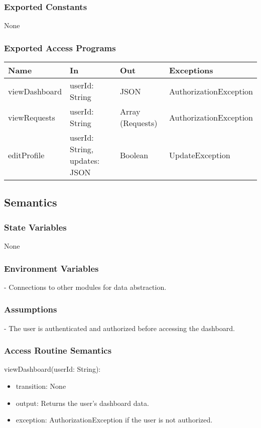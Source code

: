 \documentclass[12pt, titlepage]{article}
\begin{document}
\subsubsection{Exported Constants}
None

\subsubsection{Exported Access Programs}
\begin{center}
\begin{tabular}{p{4cm} p{4cm} p{4cm} p{2cm}}
\hline
\textbf{Name} & \textbf{In} & \textbf{Out} & \textbf{Exceptions} \\
\hline
viewDashboard & userId: String & JSON & AuthorizationException \\
viewRequests & userId: String & Array (Requests) & AuthorizationException \\
editProfile & userId: String, updates: JSON & Boolean & UpdateException \\
\hline
\end{tabular}
\end{center}

\subsection{Semantics}

\subsubsection{State Variables}
None

\subsubsection{Environment Variables}
- Connections to other modules for data abstraction.

\subsubsection{Assumptions}
- The user is authenticated and authorized before accessing the dashboard.

\subsubsection{Access Routine Semantics}
\noindent viewDashboard(userId: String):
\begin{itemize}
\item transition: None
\item output: Returns the user's dashboard data.
\item exception: AuthorizationException if the user is not authorized.
\end{itemize}
\end{document}
